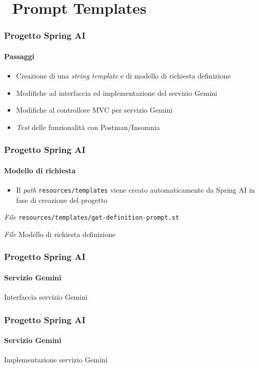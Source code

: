 \section{\faWrench\ Prompt Templates} %
\label{sec:spring-ai-gemini-prompt-templates}
%
\begin{frame}[t,fragile] \frametitle{Progetto Spring AI}
    \framesubtitle{Passaggi}
	\begin{itemize}
		\item[\alertedcircled{1}] Creazione di una \textit{string template} e di modello di richiesta definizione
        \item[\alertedcircled{2}] Modifiche ad interfaccia ed implementazione del servizio Gemini
        \item[\alertedcircled{3}] Modifiche al controllore MVC per servizio Gemini
        \item[\alertedcircled{4}] \textit{Test} delle funzionalità con Postman/Insomnia 
	\end{itemize}        
\end{frame}
%
\begin{frame}[t,fragile] \frametitle{Progetto Spring AI}
    \framesubtitle{Modello di richiesta}
        \begin{itemize}
		    \item[\alert{\faExclamationTriangle}] Il \textit{path} \texttt{resources/templates} viene creato automaticamente da Spring AI in fase di creazione del progetto
        \end{itemize}
        \begin{block}{\textit{File} \texttt{resources/templates/get-definition-prompt.st}}
			{\scriptsize}
    	\end{block}
        \begin{block}{\textit{File} Modello di richiesta definizione}
			{\scriptsize}
    	\end{block}
\end{frame}
%
\begin{frame}[t,fragile] \frametitle{Progetto Spring AI}
    \framesubtitle{Servizio Gemini}
        \begin{block}{Interfaccia servizio Gemini}
{\tiny}
    \end{block}
\end{frame}
%
\begin{frame}[t,fragile] \frametitle{Progetto Spring AI}
    \framesubtitle{Servizio Gemini}
		\vspace*{-.7cm}
        \begin{block}{Implementazione servizio Gemini}
{\tiny}
    \end{block}
\end{frame}
